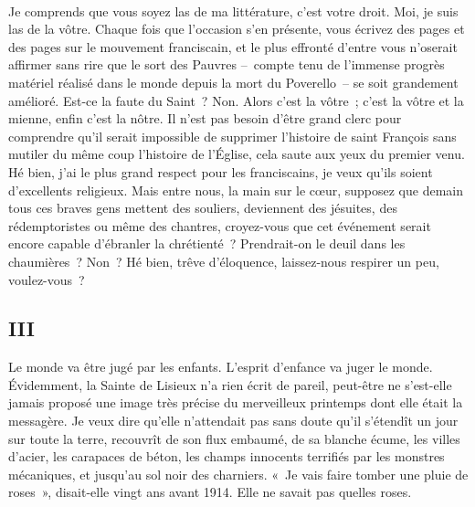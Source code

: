 \documentclass[french,twoside]{book} %
\newcommand{\astertri}{\medskip\par\centerline{\color{rubric}\large\selectfont{\syms ✻\,✻\,✻}}\medskip\par}%
\begin{document}
\astertri

\noindent  \par
Je comprends que vous soyez las de ma littérature, c’est votre droit. Moi, je suis las de la vôtre. Chaque fois que l’occasion s’en présente, vous écrivez des pages et des pages sur le mouvement franciscain, et le plus effronté d’entre vous n’oserait affirmer sans rire que le sort des Pauvres – compte tenu de l’immense progrès matériel réalisé dans le monde depuis la mort du Poverello – se soit grandement amélioré. Est-ce la faute du Saint ? Non. Alors c’est la vôtre ; c’est la vôtre et la mienne, enfin c’est la nôtre. Il n’est pas besoin d’être grand clerc pour comprendre qu’il serait impossible de supprimer l’histoire de saint François sans mutiler du même coup l’histoire de l’Église, cela saute aux yeux du premier venu. Hé bien, j’ai le plus grand respect pour les franciscains, je veux qu’ils soient d’excellents religieux. Mais entre nous, la main sur le cœur, supposez que demain tous ces braves gens mettent des souliers, deviennent des jésuites, des rédemptoristes ou même des chantres, croyez-vous que cet événement serait encore capable d’ébranler la chrétienté ? Prendrait-on le deuil dans les chaumières ? Non ? Hé bien, trêve d’éloquence, laissez-nous respirer un peu, voulez-vous ?
\subsection[{III}]{III}
\noindent Le monde va être jugé par les enfants. L’esprit d’enfance va juger le monde. Évidemment, la Sainte de Lisieux n’a rien écrit de pareil, peut-être ne s’est-elle jamais proposé une image très précise du merveilleux printemps dont elle était la messagère. Je veux dire qu’elle n’attendait pas sans doute qu’il s’étendît un jour sur toute la terre, recouvrît de son flux embaumé, de sa blanche écume, les villes d’acier, les carapaces de béton, les champs innocents terrifiés par les monstres mécaniques, et jusqu’au sol noir des charniers. « Je vais faire tomber une pluie de roses », disait-elle vingt ans avant 1914. Elle ne savait pas quelles roses.\par
 \par

\astertri
\end{document}
